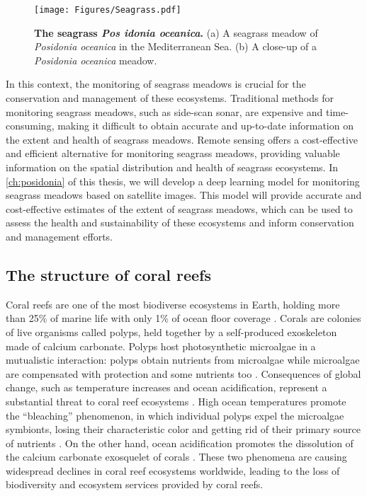\begin{figure}[H]
  \centering
  \texttt{[image: Figures/Seagrass.pdf]}
  \caption[The seagrass \textit{Posidonia oceanica}]{
    \textbf{The seagrass \textit{Pos
        idonia oceanica}.} (a) A seagrass meadow of \textit{Posidonia oceanica}
    in the Mediterranean Sea. (b) A close-up of a \textit{Posidonia oceanica}
    meadow.}
  \label{fig:Posidonia}
\end{figure}

In this context, the monitoring of seagrass meadows is crucial for the
conservation and management of these ecosystems. Traditional methods for
monitoring seagrass meadows, such as side-scan sonar, are expensive and
time-consuming, making it difficult to obtain accurate and up-to-date
information on the extent and health of seagrass meadows. Remote
sensing offers a cost-effective and efficient alternative for monitoring
seagrass meadows, providing valuable information on the spatial distribution
and health of seagrass ecosystems. In \cref{ch:posidonia} of this thesis, we
will develop a deep learning model for monitoring seagrass meadows based on
satellite images. This model will provide accurate and cost-effective estimates
of the extent of seagrass meadows, which can be used to assess the health and
sustainability of these ecosystems and inform conservation and management
efforts.

\subsection{\label{sec:The structure of coral reefs} The structure of coral
  reefs}

Coral reefs are one of the most biodiverse ecosystems in Earth, holding more
than 25\% of marine life with only 1\% of ocean floor coverage
\cite{reaka1997global}. Corals are colonies of live organisms called polyps,
held together by a self-produced exoskeleton made of calcium carbonate. Polyps
host photosynthetic microalgae in a mutualistic interaction: polyps obtain
nutrients from microalgae while microalgae are compensated with protection and
some nutrients too \cite{Muller-Parker2015}. Consequences of global change,
such as temperature increases and ocean acidification, represent a substantial
threat to coral reef ecosystems \cite{Couce2013}. High ocean temperatures
promote the ``bleaching'' phenomenon, in which individual polyps expel the
microalgae symbionts, losing their characteristic color and getting rid of
their primary source of nutrients \cite{Brown1997}. On the other hand, ocean
acidification promotes the dissolution of the calcium carbonate exosquelet of
corals \cite{Guldberg2007}. These two phenomena are causing widespread declines
in coral reef ecosystems worldwide, leading to the loss of biodiversity and
ecosystem services provided by coral reefs.

